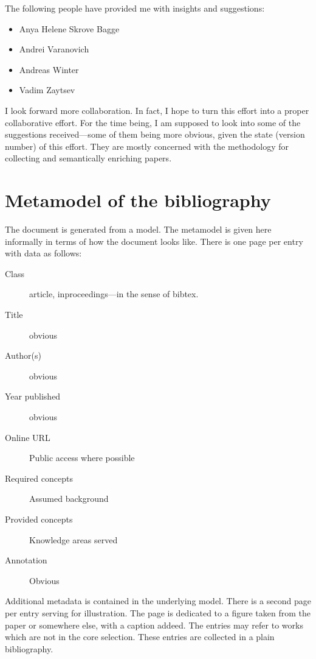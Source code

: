 \documentclass[12pt]{article}
\begin{document}
The following people have provided me with insights and suggestions:

\begin{itemize}
\item Anya Helene Skrove Bagge
\item Andrei Varanovich
\item Andreas Winter
\item Vadim Zaytsev
\end{itemize}

\noindent
I look forward more collaboration. In fact, I hope to turn this effort
into a proper collaborative effort. For the time being, I am supposed
to look into some of the suggestions received---some of them being
more obvious, given the state (version number) of this effort. They
are mostly concerned with the methodology for collecting and
semantically enriching papers.


\newpage

\section{Metamodel of the bibliography}

The document is generated from a model. The metamodel is given here
informally in terms of how the document looks like. There is one page
per entry with data as follows:

\begin{description}

\item[Class] article, inproceedings---in the sense of bibtex.

\item[Title] obvious

\item[Author(s)] obvious

\item[Year published] obvious

\item[Online URL] Public access where possible

\item[Required concepts] Assumed background

\item[Provided concepts] Knowledge areas served

\item[Annotation] Obvious

\end{description}

Additional metadata is contained in the underlying model. There is a
second page per entry serving for illustration. The page is dedicated
to a figure taken from the paper or somewhere else, with a caption
addeed. The entries may refer to works which are not in the core
selection. These entries are collected in a plain bibliography.






\end{document}
